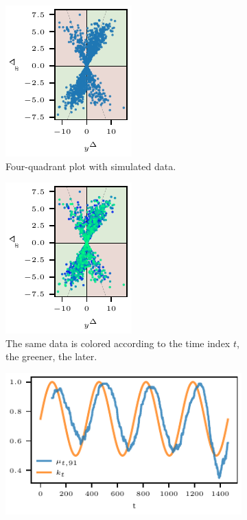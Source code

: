 \documentclass[pdflatex]{sn-jnl}
\theoremstyle{plain}%
\theoremstyle{definition}
\begin{document}
\begin{figure}
    \centering
    \begin{subfigure}[t]{.24\textwidth}
\includegraphics{plots/illustrative_examples/4Q_sample_without_time}
\caption{Four-quadrant plot with simulated data.}\label{fig:aatc_basic_4q_sample}
\end{subfigure}\hspace{0.01\textwidth}
\begin{subfigure}[t]{.24\textwidth}
\includegraphics{plots/illustrative_examples/4Q_sample_with_time}
\caption{The same data is colored according to the time index $t$, the greener, the later.}\label{fig:aatc_basic_4q_sample_color}
\end{subfigure}\hspace{0.01\textwidth}
\begin{subfigure}[t]{.48\textwidth}
    \includegraphics{plots/illustrative_examples/trending_ratio_time_series}

\end{subfigure}
\end{figure}
\end{document}
